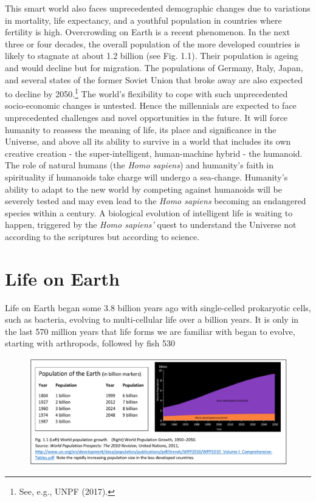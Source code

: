 \begin{multicols}{2}
This smart world also faces unprecedented demographic changes due to variations in mortality, life expectancy, and a youthful population in countries where fertility is high. Overcrowding on Earth is a recent phenomenon. In the next three or four decades, the overall population of the more developed countries is likely to stagnate at about 1.2 billion (see Fig. 1.1). Their population is ageing and would decline but for migration. The populations of Germany, Italy, Japan, and several states of the former Soviet Union that broke away are also expected to decline by 2050.\footnote{See, e.g., UNPF (2017).} The world's flexibility to cope with such unprecedented socio-economic changes is untested. Hence the millennials are expected to face unprecedented challenges and novel opportunities in the future. It will force humanity to reassess the meaning of life, its place and significance in the Universe, and above all its ability to survive in a world that includes its own creative creation - the super-intelligent, human-machine hybrid - the humanoid. The role of natural humans (the \textit{Homo sapiens}) and humanity's faith in spirituality if humanoids take charge will undergo a sea-change. Humanity's ability to adapt to the new world by competing against humanoids will be severely tested and may even lead to the \textit{Homo sapiens} becoming an endangered species within a century. A biological evolution of intelligent life is waiting to happen, triggered by the \textit{Homo sapiens'} quest to understand the Universe not according to the scriptures but according to science.

\section{Life on Earth}

{\parfillskip=0pt
Life on Earth began some 3.8 billion years ago with single-celled prokaryotic cells, such as bacteria, evolving to multi-cellular life over a billion years. It is only in the last 570 million years that life forms we are familiar with began to evolve, starting with arthropods, followed by fish 530\par}

\end{multicols}

\begin{figure}[H]
\centering
\includegraphics[scale=1.15]{src/Figures/chap1/1.eps}
\end{figure}

